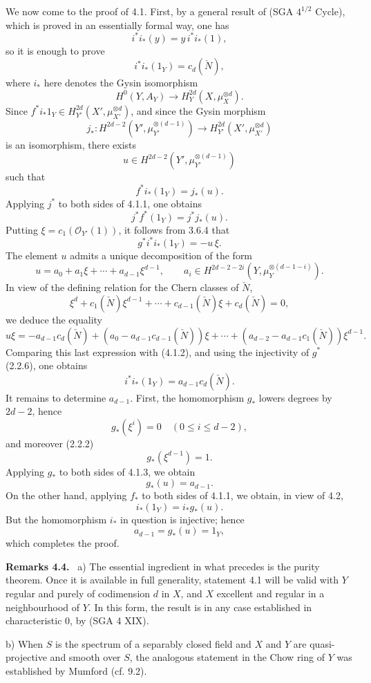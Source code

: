 \documentclass[11pt]{article}
\newenvironment{statement}[1]{\par\medskip\noindent\textbf{#1.}\ }{\par\medskip}
\begin{document}
We now come to the proof of 4.1. First, by a general result of (SGA $4^{1/2}$ Cycle), which is proved in an essentially formal way, one has
\[
i^*i_*(y)=y\,i^*i_*(1),
\]
so it is enough to prove
\[
i^*i_*(1_Y)=c_d(\check N),
\]
where $i_*$ here denotes the Gysin isomorphism
\[
H^0(Y,A_Y)\to H_Y^{2d}(X,\mu_X^{\otimes d}).
\]
Since $f^*i_*1_Y\in H_{Y'}^{2d}(X',\mu_{X'}^{\otimes d})$, and since the Gysin morphism
\[
j_*:H^{2d-2}(Y',\mu_{Y'}^{\otimes(d-1)})
\to H_{Y'}^{2d}(X',\mu_{X'}^{\otimes d})
\]
is an isomorphism, there exists
\[
u\in H^{2d-2}(Y',\mu_{Y'}^{\otimes(d-1)})
\]
such that
\[
f^*i_*(1_Y)=j_*(u).
\tag{4.1.1}
\]
Applying $j^*$ to both sides of 4.1.1, one obtains
\[
j^*f^*(1_Y)=j^*j_*(u).
\]
Putting $\xi=c_1(\mathcal O_{Y'}(1))$, it follows from 3.6.4 that
\[
g^*i^*i_*(1_Y)=-u\,\xi.
\tag{4.1.2}
\]
The element $u$ admits a unique decomposition of the form
\[
u=a_0+a_1\xi+\cdots+a_{d-1}\xi^{d-1},
\qquad
a_i\in H^{2d-2-2i}(Y,\mu_Y^{\otimes(d-1-i)}).
\tag{4.1.3}
\]
In view of the defining relation for the Chern classes of $\check N$,
\[
\xi^d+c_1(\check N)\xi^{d-1}+\cdots+c_{d-1}(\check N)\xi+c_d(\check N)=0,
\tag{4.1.4}
\]
we deduce the equality
\[
u\xi=-a_{d-1}c_d(\check N)+(a_0-a_{d-1}c_{d-1}(\check N))\xi
+\cdots+(a_{d-2}-a_{d-1}c_1(\check N))\xi^{d-1}.
\]
Comparing this last expression with (4.1.2), and using the injectivity of $g^*$ (2.2.6), one obtains
\[
i^*i_*(1_Y)=a_{d-1}c_d(\check N).
\tag{4.1.5}
\]
It remains to determine $a_{d-1}$. First, the homomorphism $g_*$ lowers degrees by $2d-2$, hence
\[
g_*(\xi^i)=0\quad(0\le i\le d-2),
\]
and moreover (2.2.2)
\[
g_*(\xi^{d-1})=1.
\]
Applying $g_*$ to both sides of 4.1.3, we obtain
\[
g_*(u)=a_{d-1}.
\tag{4.1.6}
\]
On the other hand, applying $f_*$ to both sides of 4.1.1, we obtain, in view of 4.2,
\[
i_*(1_Y)=i_*g_*(u).
\tag{4.1.7}
\]
But the homomorphism $i_*$ in question is injective; hence
\[
a_{d-1}=g_*(u)=1_Y,
\]
which completes the proof.

\begin{statement}{Remarks 4.4}
a) The essential ingredient in what precedes is the purity theorem. Once it is available in full generality, statement 4.1 will be valid with $Y$ regular and purely of codimension $d$ in $X$, and $X$ excellent and regular in a neighbourhood of $Y$. In this form, the result is in any case established in characteristic $0$, by (SGA 4 XIX).

b) When $S$ is the spectrum of a separably closed field and $X$ and $Y$ are quasi-projective and smooth over $S$, the analogous statement in the Chow ring of $Y$ was established by Mumford (cf. 9.2).
\end{statement}
\end{document}
